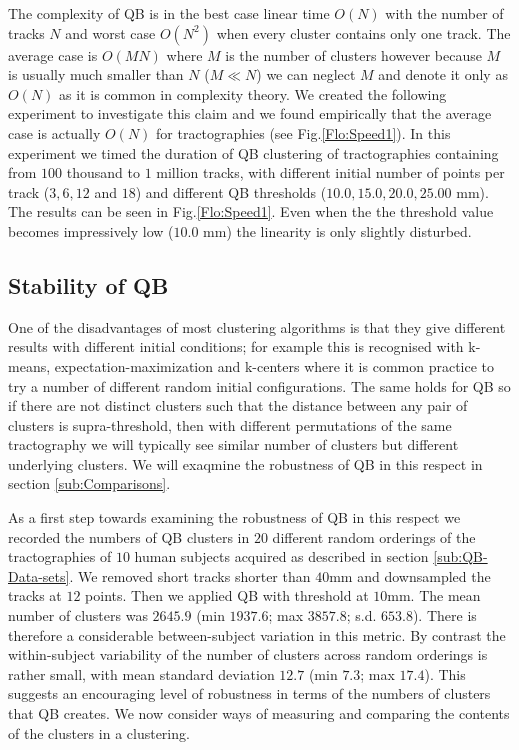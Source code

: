 \documentclass[preprint,authoryear,a4paper,10pt,onecolumn]{elsarticle}
\begin{document}
The complexity of QB is in the best case linear time $O(N)$ with
the number of tracks $N$ and worst case $O(N^{2})$ when every cluster
contains only one track. The average case is $O(MN)$ where $M$ is
the number of clusters however because $M$ is usually much smaller
than $N$ ($M\ll N$) we can neglect $M$ and denote it only as $O(N)$
as it is common in complexity theory. We created the following experiment
to investigate this claim and we found empirically that the average
case is actually $O(N)$ for tractographies (see Fig.\ref{Flo:Speed1}).
In this experiment we timed the duration of QB clustering of tractographies
containing from $100$ thousand to $1$ million tracks, with different
initial number of points per track ($3,6,12$ and $18$) and different
QB thresholds ($10.0,15.0,20.0,25.00$ mm). The results can be seen
in Fig.\ref{Flo:Speed1}. Even when the the threshold value becomes impressively
low ($10.0$ mm) the linearity is only slightly disturbed.

\subsection{Stability of QB\label{sub:Comparisons}}

One of the disadvantages of most clustering algorithms is that they give
different results with different initial conditions; for example this is
recognised with k-means, expectation-maximization
\citep{dempster1977maximum} and k-centers \citep{gonzalez1985clustering}
where it is common practice to try a number of different random initial
configurations. The same holds for QB so if there are not distinct
clusters such that the distance between any pair of clusters is
supra-threshold, then with different permutations of the same
tractography we will typically see similar number of clusters but
different underlying clusters. We will exaqmine the robustness of QB in
this respect in section \ref{sub:Comparisons}.

As a first step towards examining the robustness of QB in this respect
we recorded the numbers of QB clusters in $20$ different random
orderings of the tractographies of $10$ human subjects acquired as
described in section \ref{sub:QB-Data-sets}. We removed short tracks
shorter than $40$mm and downsampled the tracks at $12$ points. Then we
applied QB with threshold at $10$mm. The mean number of clusters was
$2645.9$ (min $1937.6$; max $3857.8$; s.d. $653.8$). There is therefore
a considerable between-subject variation in this metric. By contrast the
within-subject variability of the number of clusters across random
orderings is rather small, with mean standard deviation $12.7$ (min
$7.3$; max $17.4$). This suggests an encouraging level of robustness in
terms of the numbers of clusters that QB creates. We now consider ways
of measuring and comparing the contents of the clusters in a clustering.
\end{document}
